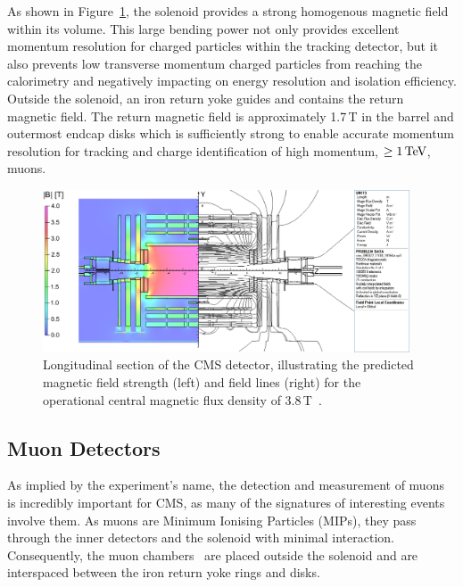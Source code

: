 As shown in Figure~\ref{fig:magneticField}, the solenoid provides a strong homogenous magnetic field within its volume.
This large bending power not only provides excellent momentum resolution for charged particles within the tracking detector, but it also prevents low transverse momentum charged particles from reaching the calorimetry and negatively impacting on energy resolution and isolation efficiency.
Outside the solenoid, an iron return yoke guides and contains the return magnetic field.
The return magnetic field is approximately 1.7\,T in the barrel and outermost endcap disks which is sufficiently strong to enable accurate momentum resolution for tracking and charge identification of high momentum, \ie $\geq 1\,\text{Te\hspace{-.08em}V}$, muons.

\begin{figure}[htb]
\begin{center}
\includegraphics[width=0.97\textwidth]{figs/cms/cms_magnetic_field.png}
\caption{Longitudinal section of the CMS detector, illustrating the predicted magnetic field strength (left) and field lines (right) for the operational central magnetic flux density of 3.8\,T~\cite{Chatrchyan:2009si}.}
\label{fig:magneticField}
\end{center}
\end{figure}

\subsection{Muon Detectors}\label{subsec:muon chambers}
As implied by the experiment's name, the detection and measurement of muons is incredibly important for CMS, as many of the signatures of interesting events involve them.
As muons are Minimum Ionising Particles (MIPs), they pass through the inner detectors and the solenoid with minimal interaction.
Consequently, the muon chambers~\cite{CMS:1997iti} are placed outside the solenoid and are interspaced between the iron return yoke rings and disks.

